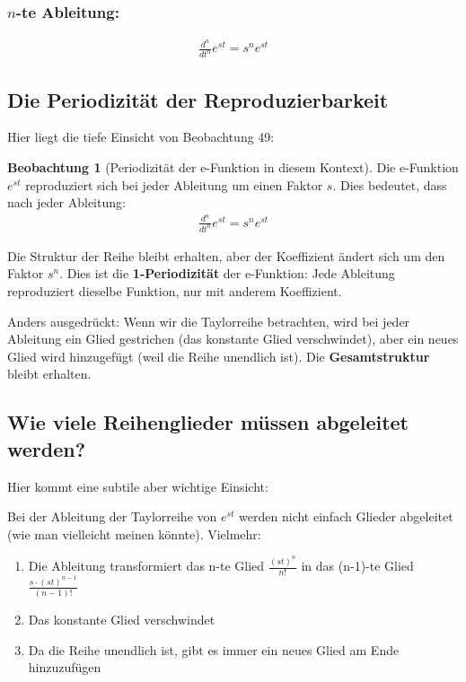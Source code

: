 \documentclass[a4paper,12pt,twoside]{report}
\theoremstyle{definition}
\newtheorem{beobachtung}{Beobachtung}
\begin{document}
\subsubsection*{$n$-te Ableitung:}

\begin{align}
	\frac{d^n}{dt^n} e^{st} = s^n e^{st}
\end{align}

\subsection{Die Periodizität der Reproduzierbarkeit}

Hier liegt die tiefe Einsicht von Beobachtung 49:

\begin{beobachtung}[Periodizität der e-Funktion in diesem Kontext]
	Die e-Funktion $e^{st}$ reproduziert sich bei jeder Ableitung um einen Faktor $s$. Dies bedeutet, dass nach jeder Ableitung:
	\begin{align}
		\frac{d^n}{dt^n} e^{st} = s^n e^{st}
	\end{align}
	
	Die Struktur der Reihe bleibt erhalten, aber der Koeffizient ändert sich um den Faktor $s^n$. Dies ist die \textbf{1-Periodizität} der e-Funktion: Jede Ableitung reproduziert dieselbe Funktion, nur mit anderem Koeffizient.
	
	Anders ausgedrückt: Wenn wir die Taylorreihe betrachten, wird bei jeder Ableitung ein Glied gestrichen (das konstante Glied verschwindet), aber ein neues Glied wird hinzugefügt (weil die Reihe unendlich ist). Die \textbf{Gesamtstruktur} bleibt erhalten.
\end{beobachtung}

\subsection{Wie viele Reihenglieder müssen abgeleitet werden?}

Hier kommt eine subtile aber wichtige Einsicht:

Bei der Ableitung der Taylorreihe von $e^{st}$ werden nicht einfach Glieder abgeleitet (wie man vielleicht meinen könnte). Vielmehr:

\begin{enumerate}
	\item Die Ableitung transformiert das n-te Glied $\frac{(st)^n}{n!}$ in das (n-1)-te Glied $\frac{s \cdot (st)^{n-1}}{(n-1)!}$
	\item Das konstante Glied verschwindet
	\item Da die Reihe unendlich ist, gibt es immer ein neues Glied am Ende hinzuzufügen
\end{enumerate}
\end{document}

